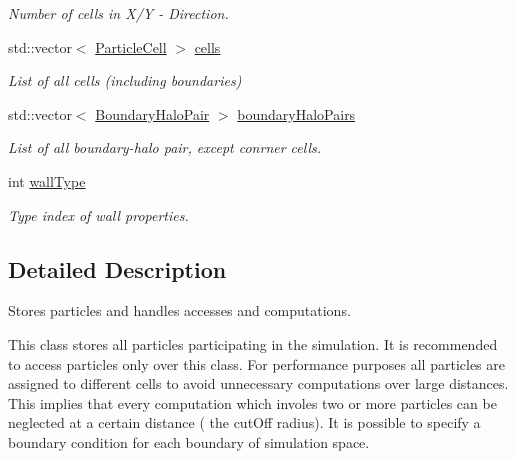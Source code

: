 \begin{DoxyCompactItemize}
\begin{DoxyCompactList}\small\item\em Number of cells in X/\-Y -\/ Direction. \end{DoxyCompactList}\item 
std\-::vector$<$ \hyperlink{classSimulation_1_1ParticleCell}{Particle\-Cell} $>$ \hyperlink{classSimulation_1_1ParticleContainer_a3836f9563a3827414df5288a2f3fcee6}{cells}
\begin{DoxyCompactList}\small\item\em List of all cells (including boundaries) \end{DoxyCompactList}\item 
std\-::vector$<$ \hyperlink{structSimulation_1_1ParticleContainer_1_1BoundaryHaloPair}{Boundary\-Halo\-Pair} $>$ \hyperlink{classSimulation_1_1ParticleContainer_a7d56f7233d097b228ddea76670a9861f}{boundary\-Halo\-Pairs}
\begin{DoxyCompactList}\small\item\em List of all boundary-\/halo pair, except conrner cells. \end{DoxyCompactList}\item 
int \hyperlink{classSimulation_1_1ParticleContainer_a257c23a232693610d47c0ee082085a49}{wall\-Type}
\begin{DoxyCompactList}\small\item\em Type index of wall properties. \end{DoxyCompactList}\end{DoxyCompactItemize}


\subsection{Detailed Description}
Stores particles and handles accesses and computations. 

This class stores all particles participating in the simulation. It is recommended to access particles only over this class. For performance purposes all particles are assigned to different cells to avoid unnecessary computations over large distances. This implies that every computation which involes two or more particles can be neglected at a certain distance ( the cut\-Off radius). It is possible to specify a boundary condition for each boundary of simulation space. 


